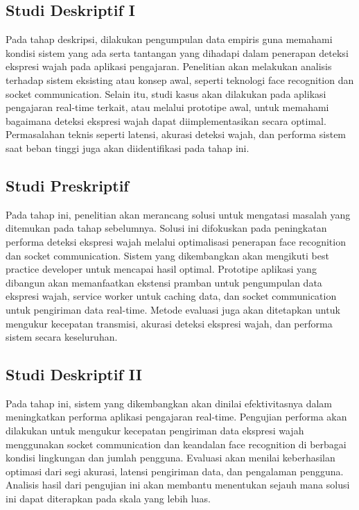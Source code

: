 \subsection{Studi Deskriptif I}
Pada tahap deskripsi, dilakukan pengumpulan data empiris guna memahami kondisi sistem yang ada serta tantangan yang dihadapi dalam penerapan deteksi ekspresi wajah pada aplikasi pengajaran. Penelitian akan melakukan analisis terhadap sistem eksisting atau konsep awal, seperti teknologi face recognition dan socket communication. Selain itu, studi kasus akan dilakukan pada aplikasi pengajaran real-time terkait, atau melalui prototipe awal, untuk memahami bagaimana deteksi ekspresi wajah dapat diimplementasikan secara optimal. Permasalahan teknis seperti latensi, akurasi deteksi wajah, dan performa sistem saat beban tinggi juga akan diidentifikasi pada tahap ini.

\subsection{Studi Preskriptif}
Pada tahap ini, penelitian akan merancang solusi untuk mengatasi masalah yang ditemukan pada tahap sebelumnya. Solusi ini difokuskan pada peningkatan performa deteksi ekspresi wajah melalui optimalisasi penerapan face recognition dan socket communication. Sistem yang dikembangkan akan mengikuti best practice developer untuk mencapai hasil optimal. Prototipe aplikasi yang dibangun akan memanfaatkan ekstensi pramban untuk pengumpulan data ekspresi wajah, service worker untuk caching data, dan socket communication untuk pengiriman data real-time. Metode evaluasi juga akan ditetapkan untuk mengukur kecepatan transmisi, akurasi deteksi ekspresi wajah, dan performa sistem secara keseluruhan.

\subsection{Studi Deskriptif II}
Pada tahap ini, sistem yang dikembangkan akan dinilai efektivitasnya dalam meningkatkan performa aplikasi pengajaran real-time. Pengujian performa akan dilakukan untuk mengukur kecepatan pengiriman data ekspresi wajah menggunakan socket communication dan keandalan face recognition di berbagai kondisi lingkungan dan jumlah pengguna. Evaluasi akan menilai keberhasilan optimasi dari segi akurasi, latensi pengiriman data, dan pengalaman pengguna. Analisis hasil dari pengujian ini akan membantu menentukan sejauh mana solusi ini dapat diterapkan pada skala yang lebih luas.

